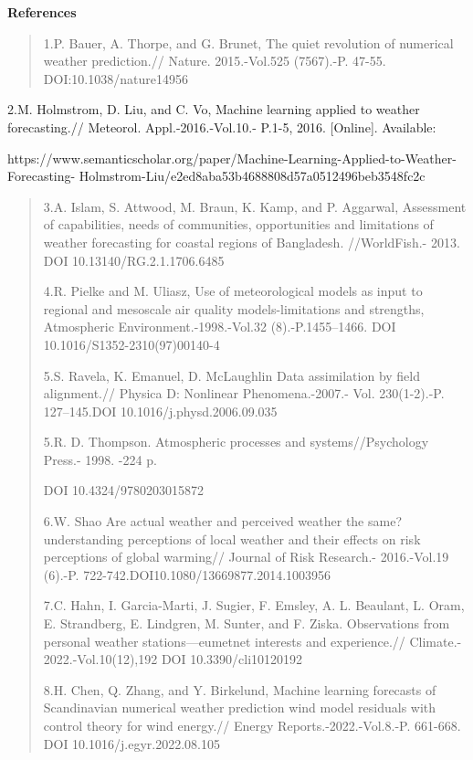 \textbf{References}

\begin{quote}
1.P. Bauer, A. Thorpe, and G. Brunet, The quiet revolution of numerical
weather prediction.// Nature. 2015.-Vol.525 (7567).-P. 47-55.
DOI:10.1038/nature14956
\end{quote}

2.M. Holmstrom, D. Liu, and C. Vo, Machine learning applied to weather
forecasting.// Meteorol. Appl.-2016.-Vol.10.- P.1-5, 2016. {[}Online{]}.
Available:

https://www.semanticscholar.org/paper/Machine-Learning-Applied-to-Weather-Forecasting-
Holmstrom-Liu/e2ed8aba53b4688808d57a0512496beb3548fc2c

\begin{quote}
3.A. Islam, S. Attwood, M. Braun, K. Kamp, and P. Aggarwal, Assessment
of capabilities, needs of communities, opportunities and limitations of
weather forecasting for coastal regions of Bangladesh. //WorldFish.-
2013. DOI 10.13140/RG.2.1.1706.6485

4.R. Pielke and M. Uliasz, Use of meteorological models as input to
regional and mesoscale air quality models-limitations and strengths,
Atmospheric Environment.-1998.-Vol.32 (8).-P.1455--1466. DOI
10.1016/S1352-2310(97)00140-4

5.S. Ravela, K. Emanuel, D. McLaughlin Data assimilation by field
alignment.// Physica D: Nonlinear Phenomena.-2007.- Vol. 230(1-2).-P.
127--145.DOI 10.1016/j.physd.2006.09.035

5.R. D. Thompson. Atmospheric processes and systems//Psychology Press.-
1998. -224 p.

DOI 10.4324/9780203015872

6.W. Shao Are actual weather and perceived weather the same?
understanding perceptions of local weather and their effects on risk
perceptions of global warming// Journal of Risk Research.- 2016.-Vol.19
(6).-P. 722-742.DOI10.1080/13669877.2014.1003956

7.C. Hahn, I. Garcia-Marti, J. Sugier, F. Emsley, A. L. Beaulant, L.
Oram, E. Strandberg, E. Lindgren, M. Sunter, and F. Ziska. Observations
from personal weather stations---eumetnet interests and experience.//
Climate.- 2022.-Vol.10(12),192 DOI 10.3390/cli10120192

8.H. Chen, Q. Zhang, and Y. Birkelund, Machine learning forecasts of
Scandinavian numerical weather prediction wind model residuals with
control theory for wind energy.// Energy Reports.-2022.-Vol.8.-P.
661-668. DOI 10.1016/j.egyr.2022.08.105


\end{quote}
